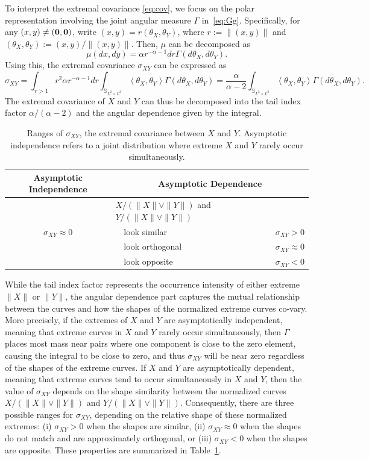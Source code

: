 \documentclass[lineno]{biometrika}
\newcommand \ag{\alpha}
\newcommand \Gg{\Gamma}
\newcommand \sg{\sigma}
\newcommand{\thg}{\theta}%
\newcommand\bzero{\mbox{\boldmath${0}$}}
\newcommand\mbS{{\mathbb S}}
\newcommand\lip{\left \langle}
\newcommand\rip{\right \rangle}
\begin{document}
To interpret  the extremal covariance \eqref{eq:cov}, we focus on the
polar representation involving the joint angular measure
$\Gg$ in~\eqref{eq:Gg}. Specifically, for any
$(x,y) \neq (\bzero, \bzero)$, write $(x,y)
= r(\thg_X, \thg_Y)$, where $r:=\|(x,y)\|$ and $(\thg_X, \thg_Y) := (x,y)/\|(x,y)\|$. Then, $\mu$ can be decomposed as
\[
\mu(dx,dy) = \ag r^{-\ag-1} dr \Gg(d\thg_X,d\thg_Y).
\]
Using this, the extremal covariance $\sigma_{XY}$ can be expressed as
\begin{equation} \label{eq:cov_pol}
\sg_{XY} = \int_{r >1} r^2 \ag r^{-\ag-1} dr
\int_{\mbS_{L^2 \times L^2}} \lip \thg_X, \thg_Y \rip \Gg (d\thg_X,d\thg_Y) = \frac{\ag}{\ag-2} \int_{\mbS_{L^2 \times L^2}} \lip \thg_X, \thg_Y \rip \Gg (d\thg_X,d\thg_Y).
\end{equation}
The extremal covariance of $X$ and $Y$ can thus be decomposed into
the tail index factor $\ag/(\ag - 2)$ and the angular dependence
given by the integral.



\begin{table}[t]
\caption{Ranges of $\sg_{XY}$, the extremal covariance between $X$ and $Y$. Asymptotic independence refers to a joint distribution where
extreme $X$ and $Y$ rarely occur simultaneously.}  \label{t:ga}
\centering
\medskip
\begin{tabular}{c|lc}
\hline\hline
Asymptotic Independence & \multicolumn{2}{c}{Asymptotic Dependence} \\
\hline
& $X/(\|X\| \vee \|Y\|)$ and $Y/(\|X\| \vee \|Y\|)$ & \\
$\sg_{XY} \approx 0$& \ \ look similar & $\sg_{XY} >0$  \\
& \ \ look orthogonal & $\sg_{XY}\approx 0$ \\
& \ \ look opposite & $\sg_{XY}<0$ \\
\hline \hline
\end{tabular}
\end{table}

While the tail index factor represents the occurrence
intensity of either extreme $\| X\|$ or $\| Y\|$, the angular
dependence part captures the mutual relationship between the curves and how the shapes of the normalized extreme curves co-vary. More precisely, if the extremes of $X$ and $Y$ are asymptotically independent, meaning that extreme curves in $X$ and $Y$ rarely occur simultaneously, then $\Gamma$ places most mass near pairs where one component is close to the zero element, causing the integral to be close to zero, and thus $\sigma_{XY}$ will be near zero regardless of the shapes of the extreme curves. If $X$ and $Y$ are asymptotically dependent, meaning that extreme curves tend to occur simultaneously in $X$ and $Y$, then the value of $\sigma_{XY}$ depends on the shape similarity between the normalized curves $X/(\|X\| \vee \|Y\|)$ and $Y/(\|X\| \vee \|Y\|)$. Consequently, there are three possible ranges for $\sg_{XY}$, depending on the relative shape of these normalized extremes: (i) $\sg_{XY}>0$ when the shapes are similar, (ii) $\sg_{XY} \approx 0$ when the shapes do not match and are approximately orthogonal, or (iii) $\sg_{XY}<0$ when the shapes are opposite. These properties are summarized in Table~\ref{t:ga}.
\end{document}

